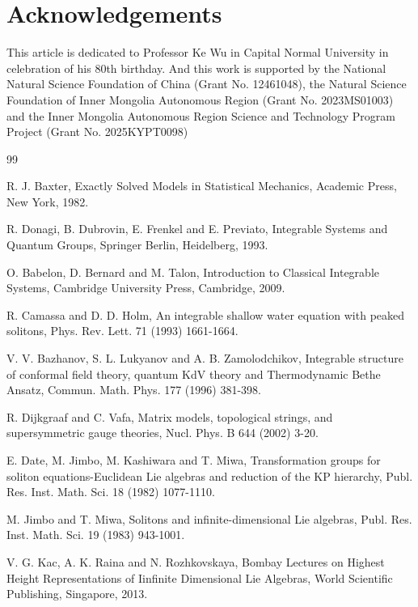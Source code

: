 \documentclass[11pt,reqno]{amsart}
\numberwithin{equation}{section}
\begin{document}
\section{Acknowledgements}
This article is dedicated to Professor Ke Wu in Capital Normal University in celebration of his 80th birthday. And this work is supported by the National Natural Science Foundation of China (Grant No. 12461048), the Natural Science Foundation of Inner Mongolia Autonomous Region (Grant No. 2023MS01003)  and the Inner Mongolia Autonomous Region Science and Technology Program Project (Grant No. 2025KYPT0098)

\begin{thebibliography}{99}

R. J. Baxter, Exactly Solved Models in Statistical Mechanics, Academic Press, New York, 1982.


R. Donagi, B. Dubrovin, E. Frenkel and E. Previato, Integrable Systems and Quantum Groups, Springer Berlin, Heidelberg, 1993.


O. Babelon, D. Bernard and M. Talon, Introduction to Classical Integrable Systems, Cambridge University Press, Cambridge, 2009.

R. Camassa and D. D. Holm, An integrable shallow water equation with peaked solitons, Phys. Rev. Lett. 71 (1993) 1661-1664.


V. V. Bazhanov, S. L. Lukyanov and A. B. Zamolodchikov, Integrable structure of conformal field theory, quantum KdV theory and Thermodynamic Bethe Ansatz, Commun. Math. Phys. 177 (1996) 381-398.

R. Dijkgraaf and C. Vafa, Matrix models, topological strings, and supersymmetric gauge theories, Nucl. Phys. B 644 (2002) 3-20.


E. Date, M. Jimbo, M. Kashiwara and T. Miwa, Transformation groups for soliton equations-Euclidean Lie algebras and reduction of the KP hierarchy, Publ. Res. Inst. Math. Sci. 18 (1982) 1077-1110.

M. Jimbo and T. Miwa, Solitons and infinite-dimensional Lie algebras, Publ. Res. Inst. Math. Sci. 19 (1983) 943-1001.


V. G. Kac, A. K. Raina and N. Rozhkovskaya, Bombay Lectures on Highest Height Representations of Iinfinite Dimensional Lie Algebras, World Scientific Publishing, Singapore, 2013.


\end{thebibliography}
\end{document}
